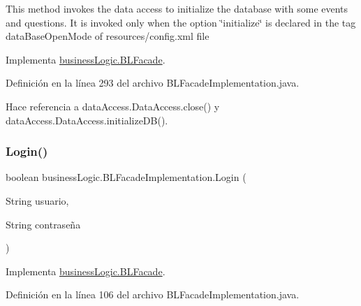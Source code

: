 This method invokes the data access to initialize the database with some events and questions. It is invoked only when the option \char`\"{}initialize\char`\"{} is declared in the tag data\+Base\+Open\+Mode of resources/config.\+xml file 

Implementa \mbox{\hyperlink{interfacebusinessLogic_1_1BLFacade_a8c041928b06257ae83a56fa86e8c282b}{business\+Logic.\+B\+L\+Facade}}.



Definición en la línea 293 del archivo B\+L\+Facade\+Implementation.\+java.


\begin{DoxyCode}{0}

\end{DoxyCode}


Hace referencia a data\+Access.\+Data\+Access.\+close() y data\+Access.\+Data\+Access.\+initialize\+D\+B().

\mbox{\label{classbusinessLogic_1_1BLFacadeImplementation_afa698129a017866dfc8ae32601fd00fe}} 
\subsubsection{\texorpdfstring{Login()}{Login()}}
{\footnotesize\ttfamily boolean business\+Logic.\+B\+L\+Facade\+Implementation.\+Login (\begin{DoxyParamCaption}\item[{String}]{usuario,  }\item[{String}]{contraseña }\end{DoxyParamCaption})}



Implementa \mbox{\hyperlink{interfacebusinessLogic_1_1BLFacade_adef077ad68e73cc18466c7f8805f1516}{business\+Logic.\+B\+L\+Facade}}.



Definición en la línea 106 del archivo B\+L\+Facade\+Implementation.\+java.


